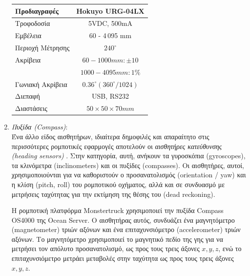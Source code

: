\begin{enumerate}
\begin{table}[!ht]
	\centering
	\label{tab:hokuyo_specs}
	\begin{tabular}{| l | c |}
		\hline
	   \textbf{Προδιαγραφές} & \textbf{Hokuyo URG-04LX} \\ \hline
	   Τροφοδοσία & 5VDC, 500mA\\ \hline
	   Εμβέλεια & 60 - 4\,095 mm \\ \hline
	   Περιοχή Μέτρησης & $240^{\circ}$\\ \hline
	   Ακρίβεια & $60 - 1000mm: \pm 10$ \\
   		& $1000 - 4095mm: 1\%$ \\ \hline
	  	Γωνιακή Ακρίβεια & $0.36^{\circ} (360^{\circ}/1024)$ \\ \hline
	  	Διεπαφή & USB, RS232 \\ \hline
	  	Διαστάσεις & $50 \times 50 \times 70 mm$ \\ \hline
	\end{tabular}
\end{table}

\bigskip
\item \textit{Πυξίδα (Compass)}:\\
Ένα άλλο είδος αισθητήρων, ιδιαίτερα δημοφιλές και απαραίτητο στις περισσότερες ρομποτικές εφαρμογές αποτελούν οι \textit{αισθητήρες κατεύθυνσης (heading sensors)} \cite{autonomous_mobile_robots}. Στην κατηγορία, αυτή, ανήκουν τα {γυροσκόπια (gyroscopes)}, τα {κλινόμετρα (inclinometers)} και οι {πυξίδες (compasses)}. Οι αισθητήρες, αυτοί, χρησιμοποιούνται για να καθοριστούν ο {προσανατολισμός (orientation / yaw)} και η {κλίση (pitch, roll)} του ρομποτικού οχήματος, αλλά και σε συνδυασμό με μετρήσεις ταχύτητας για την εκτίμηση της θέσης του ({dead reckoning}).

Η ρομποτική πλατφόρμα {Monstertruck} χρησιμοποιεί την {πυξίδα Compass OS4000} της {Ocean Server}. Ο αισθητήρας αυτός, συνδυάζει ένα {μαγνητόμετρο (magnetometer)} τριών αξόνων και ένα {επιταχυνσιόμετρο (accelerometer)} τριών αξόνων. Το μαγνητόμετρο χρησιμοποιεί το μαγνητικό πεδίο της γης για να μετρήσει τον απόλυτο προσανατολισμό, ως προς τους τρεις άξονες $x, y, z$, ενώ το επιταχυνσιόμετρο μετράει μεταβολές στην ταχύτητα ως προς τους τρεις άξονες $x, y, z$.


\end{enumerate}
